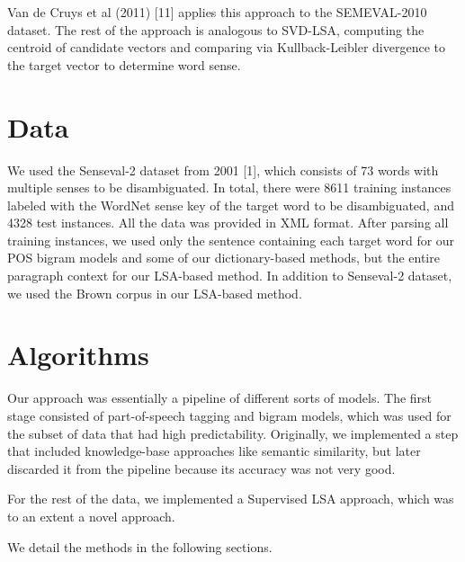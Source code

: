 \documentclass[10pt, letterpaper]{article}
\begin{document}
	Van de Cruys et al (2011) [11] applies this approach to the SEMEVAL-2010 dataset. The rest of the approach is analogous to SVD-LSA, computing the centroid  of candidate vectors and comparing via Kullback-Leibler divergence to the target vector to determine word sense. 

	\section{Data}
	We used the Senseval-2 dataset from 2001 [1], which consists of 73 words with multiple senses to be disambiguated. In total, there were 8611 training instances labeled with the WordNet sense key of the target word to be disambiguated, and 4328 test instances. All the data was provided in XML format. After parsing all training instances, we used only the sentence containing each target word for our POS bigram models and some of our dictionary-based methods, but the entire paragraph context for our LSA-based method. In addition to Senseval-2 dataset, we used the Brown corpus in our LSA-based method.

	\section{Algorithms}

	 Our approach was essentially a pipeline of different sorts of models. 
	 The first stage consisted of part-of-speech tagging and bigram models, which
	 was used for the subset of data that had high predictability. 
	 Originally, we implemented a step that included knowledge-base approaches like
	 semantic similarity, but later discarded it from the pipeline because its accuracy
	 was not very good. 

	 For the rest of the data, we implemented a Supervised LSA approach, which was to
	 an extent a novel approach. 

	 We detail the methods in the following sections.  
\end{document}
